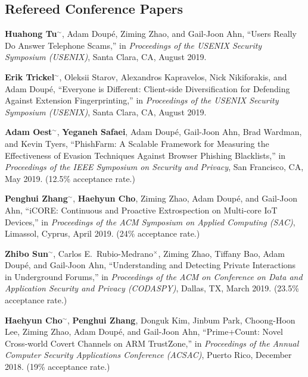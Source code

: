 \documentclass[11pt,letterpaper,sans]{moderncv}
\begin{document}
\subsection{Refereed Conference Papers}

\begin{etaremune}

\item \textbf{Huahong Tu}$^{\sim}$, Adam Doup\'e, Ziming Zhao, and Gail-Joon Ahn, ``Users Really Do Answer Telephone Scams,'' in \emph{Proceedings of the USENIX Security Symposium (USENIX)}, Santa Clara, CA, August 2019. 

\item \textbf{Erik Trickel}$^{\sim}$, Oleksii Starov, Alexandros Kapravelos, Nick Nikiforakis, and Adam Doup\'e, ``Everyone is Different: Client-side Diversification for Defending Against Extension Fingerprinting,'' in \emph{Proceedings of the USENIX Security Symposium (USENIX)}, Santa Clara, CA, August 2019. 

\item \textbf{Adam Oest}$^{\sim}$, \textbf{Yeganeh Safaei}, Adam Doup\'e, Gail-Joon Ahn, Brad Wardman, and Kevin Tyers, ``PhishFarm: A Scalable Framework for Measuring the Effectiveness of Evasion Techniques Against Browser Phishing Blacklists,'' in \emph{Proceedings of the IEEE Symposium on Security and Privacy}, San Francisco, CA, May 2019. (12.5\% acceptance rate.)

\item \textbf{Penghui Zhang}$^{\sim}$, \textbf{Haehyun Cho}, Ziming Zhao, Adam Doup\'e, and Gail-Joon Ahn, ``iCORE: Continuous and Proactive Extrospection on Multi-core IoT Devices,'' in \emph{Proceedings of the ACM Symposium on Applied Computing (SAC)}, Limassol, Cyprus, April 2019. (24\% acceptance rate.)
  
\item \textbf{Zhibo Sun}$^{\sim}$, Carlos E.\ Rubio-Medrano$^\times$, Ziming Zhao, Tiffany Bao, Adam Doup\'e, and Gail-Joon Ahn, ``Understanding and Detecting Private Interactions in Underground Forums,'' in \emph{Proceedings of the ACM on Conference on Data and Application Security and Privacy (CODASPY)}, Dallas, TX, March 2019. (23.5\% acceptance rate.)

\item \textbf{Haehyun Cho}$^{\sim}$, \textbf{Penghui Zhang}, Donguk Kim, Jinbum Park, Choong-Hoon Lee, Ziming Zhao, Adam Doup\'e, and Gail-Joon Ahn, ``Prime+Count: Novel Cross-world Covert Channels on ARM TrustZone,'' in \emph{Proceedings of the Annual Computer Security Applications Conference (ACSAC)}, Puerto Rico, December 2018. (19\% acceptance rate.)


\end{etaremune}
\end{document}
